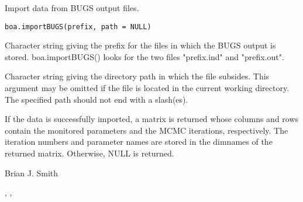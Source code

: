 \begin{Description}\relax
Import data from BUGS output files.
\end{Description}
\begin{Usage}
\begin{verbatim}
boa.importBUGS(prefix, path = NULL)
\end{verbatim}
\end{Usage}
\begin{Arguments}
\begin{ldescription}
\item[\code{prefix}] Character string giving the prefix for the files in which the 
BUGS output is stored. boa.importBUGS() looks for the two files "prefix.ind" 
and "prefix.out".
\item[\code{path}] Character string giving the directory path in which the file
subsides. This argument may be omitted if the file is located in the current
working directory.  The specified path should not end with a slash(es).
\end{ldescription}
\end{Arguments}
\begin{Value}
If the data is successfully imported, a matrix is returned whose columns and 
rows contain the monitored parameters and the MCMC iterations, respectively. 
The iteration numbers and parameter names are stored in the dimnames of the 
returned matrix. Otherwise, NULL is returned.
\end{Value}
\begin{Author}\relax
Brian J. Smith
\end{Author}
\begin{SeeAlso}\relax
{}, ,
\end{SeeAlso}

